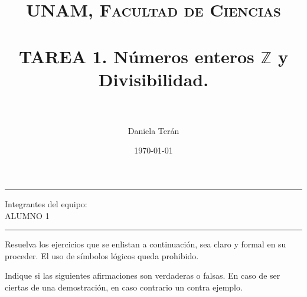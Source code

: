 \documentclass[fontsize=12pt]{scrartcl}
\title{	
	\normalfont \normalsize 
	\textsc{UNAM, Facultad de Ciencias} \\ [25pt] 
	\horrule{0.5pt} \\[0.4cm] 
	\huge TAREA 1. N\'umeros enteros $\mathbb{Z}$ y Divisibilidad.\\ 
	\horrule{2pt} \\[0.5cm] 
}
\author{Daniela Ter\'an}
\date{\normalsize\today}
\begin{document}
	
	
	
	
\maketitle
\begin{center}
		\noindent\rule{\textwidth}{1pt}
		Integrantes del equipo:\\
		ALUMNO 1\\
%		
		\noindent\rule{\textwidth}{1pt}  
\end{center}

	Resuelva los ejercicios que se enlistan a continuaci\'on, sea claro y formal 
	en su proceder. El uso de s\'imbolos l\'ogicos queda prohibido.
		
	Indique si las siguientes afirmaciones son verdaderas o falsas. En caso de 
	ser ciertas de una demostraci\'on, en caso contrario un contra ejemplo.
	
\end{document}
